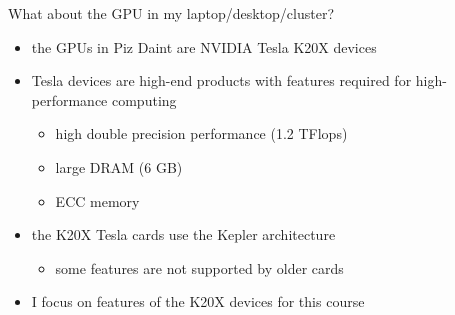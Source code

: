\begin{frame}[fragile]{}
    \begin{info}{What about the GPU in my laptop/desktop/cluster?}
        \begin{itemize}
            \item the GPUs in Piz Daint are NVIDIA Tesla K20X devices
            \item Tesla devices are high-end products with features required for high-performance computing
            \begin{itemize}
                \item high double precision performance (1.2 TFlops)
                \item large DRAM (6 GB)
                \item ECC memory
            \end{itemize}
            \item the K20X Tesla cards use the Kepler architecture
            \begin{itemize}
                \item some features are not supported by older cards
            \end{itemize}
            \item I focus on features of the K20X devices for this course
        \end{itemize}
    \end{info}

\end{frame}

